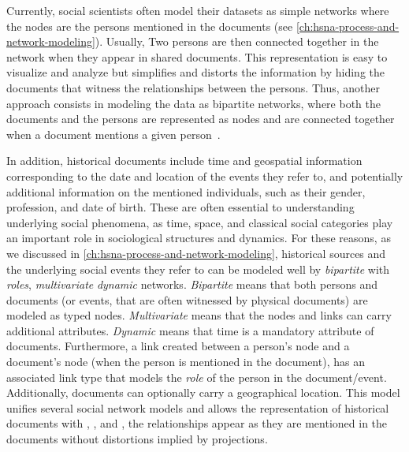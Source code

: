 Currently, social scientists often model their datasets as simple networks where the nodes are the persons mentioned in the documents (see \autoref{ch:hsna-process-and-network-modeling}).
Usually, Two persons are then connected together in the network when they appear in shared documents.
This representation is easy to visualize and analyze but simplifies and distorts the information by hiding the documents that witness the relationships between the persons.
Thus, another approach consists in modeling the data as bipartite networks, where both the documents and the persons are represented as nodes and are connected together when a document mentions a given person~\cite{grandjeanAnalisiVisualizzazioniReti2017, rossiExplorationLargeDatabase2014, shafieHypergraphRepresentationsStudy2017}.

In addition, historical documents include time and geospatial information corresponding to the date and location of the events they refer to, and potentially additional information on the mentioned individuals, such as their gender, profession, and date of birth.
These are often essential to understanding underlying social phenomena, as time, space, and classical social categories play an important role in sociological structures and dynamics\cite{lemercier12FormalNetwork2015}.
For these reasons, as we discussed in \autoref{ch:hsna-process-and-network-modeling}, historical sources and the underlying social events they refer to can be modeled well by \emph{bipartite} with \emph{roles},  \emph{multivariate} \emph{dynamic} networks. \emph{Bipartite} means that both persons and documents (or events, that are often witnessed by physical documents) are modeled as typed nodes. \emph{Multivariate} means that the nodes and links can carry additional attributes. \emph{Dynamic} means that time is a mandatory attribute of documents.
Furthermore, a link created between a person's node and a document's node (when the person is mentioned in the document), has an associated link type that models the \emph{role} of the person in the document/event.
Additionally, documents can optionally carry a geographical location.
This model unifies several social network models and allows the representation of historical documents with \simplicity, \traceability, and \reality, \ie the relationships appear as they are mentioned in the documents without distortions implied by projections\cite{cristofoliAuxSourcesGrands2008}.

